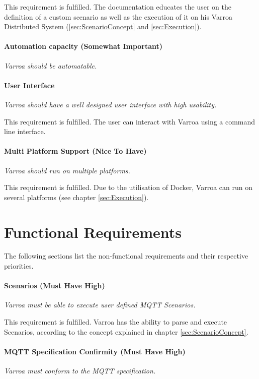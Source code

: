 This requirement is fulfilled.
The documentation educates the user on the definition of a custom scenario as well as the execution of it on his Varroa Distributed System (\ref{sec:ScenarioConcept} and \ref{sec:Execution}).

\paragraph{Automation capacity (Somewhat Important)} 
\emph{Varroa should be automatable.}


\paragraph{User Interface}
\emph{Varroa should have a well designed user interface with high usability.}

This requirement is fulfilled.
The user can interact with Varroa using a command line interface.

\paragraph{Multi Platform Support (Nice To Have)}
\emph{Varroa should run on multiple platforms.}

This requirement is fulfilled.
Due to the utilisation of Docker, Varroa can run on several platforms (see chapter \ref{sec:Execution}).

\section{Functional Requirements}
The following sections list the non-functional requirements and their respective priorities.

\paragraph{Scenarios (Must Have High)}
\emph{Varroa must be able to execute user defined MQTT Scenarios.}

This requirement is fulfilled.
Varroa has the ability to parse and execute Scenarios, according to the concept explained in chapter \ref{sec:ScenarioConcept}.

\paragraph{MQTT Specification Confirmity (Must Have High)}
\emph{Varroa must conform to the MQTT specification.}

